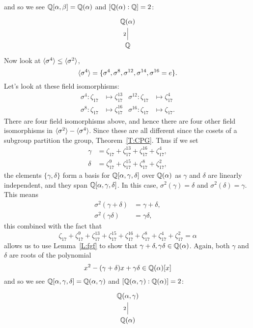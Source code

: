 \documentclass{ximera}
\begin{document}
\begin{example}
\[  \]
  and so we see $\mathbb Q[\alpha,\beta]= \mathbb Q(\alpha)$ and $[\mathbb Q(\alpha):\mathbb Q] =
  2$:
  \[
  \begin{tikzcd}
    \Q(\alpha) \\ \Q \ar[u,-,"2"]
  \end{tikzcd}
  \]
  Now look at $\langle\sigma^4\rangle\leq \langle \sigma^2\rangle$,
  \[
  \langle\sigma^4\rangle = \{ \sigma^4, \sigma^8,\sigma^{12},\sigma^{14},\sigma^{16} = e\}.
  \]
  Let's look at these field isomorphisms:
  \begin{align*}
    \sigma^4: \zeta_{17} &\mapsto \zeta_{17}^{13}    & \sigma^{12}: \zeta_{17} &\mapsto \zeta_{17}^{4}\\
    \sigma^8: \zeta_{17} &\mapsto \zeta_{17}^{16} & \sigma^{16}: \zeta_{17} &\mapsto \zeta_{17}.
  \end{align*}
  There are four field isomorphisms above, and hence there are four
  other field isomorphisms in $\langle\sigma^2\rangle - \langle \sigma^4\rangle$. Since 
  these are all different since the cosets of a subgroup partition the
  group, Theorem~\ref{T:CPG}. Thus if we set
  \begin{align*}
    \gamma &= \zeta_{17}   + \zeta_{17}^{13} + \zeta_{17}^{16} + \zeta_{17}^{4},\\
    \delta &= \zeta_{17}^9 + \zeta_{17}^{15} + \zeta_{17}^{8} + \zeta_{17}^{2},
  \end{align*}
  the elements $\{\gamma,\delta\}$ form a basis for
  $\mathbb Q[\alpha,\gamma,\delta]$ over $\mathbb Q(\alpha)$ as $\gamma$ and
  $\delta$ are linearly independent, and they span
  $\mathbb Q[\alpha,\gamma,\delta]$.  In this case, $\sigma^2(\gamma)= \delta$ and
  $\sigma^2(\delta) = \gamma$. This means
  \begin{align*}
    \sigma^2(\gamma+\delta) &= \gamma + \delta,\\
    \sigma^2(\gamma\delta) &= \gamma\delta,
  \end{align*}
  this combined with the fact that
  \[
   \zeta_{17} + \zeta_{17}^9 + \zeta_{17}^{13} + \zeta_{17}^{15} +
   \zeta_{17}^{16} + \zeta_{17}^{8} + \zeta_{17}^{4} + \zeta_{17}^{2}
   = \alpha
  \]
  allows us to use Lemma~\ref{L:fgf} to show that
  $\gamma+\delta,\gamma\delta\in\mathbb Q(\alpha)$. Again, both $\gamma$ and
  $\delta$ are roots of the polynomial
  \[
  x^2 - (\gamma +\delta) x + \gamma\delta\in\mathbb Q(\alpha)[x]
  \]
  and so we see $\mathbb Q[\alpha,\gamma,\delta] = \mathbb Q(\alpha,\gamma)$ and
  $[\mathbb Q(\alpha,\gamma):\mathbb Q(\alpha)] = 2$:
  \[
  \begin{tikzcd}
    \Q(\alpha,\gamma)\\
    \Q(\alpha) \ar[u,-,"2"]\\

\end{tikzcd}\]
\end{example}
\end{document}
